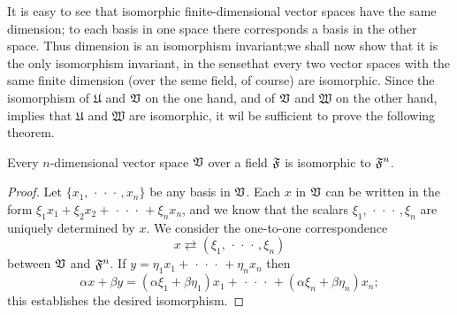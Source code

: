 It is easy to see that isomorphic finite-dimensional vector spaces have the same
dimension; to each basis in one space there corresponds a basis in the other
space. Thus dimension is an isomorphism invariant;we shall now show that it is
the only isomorphism invariant, in the sensethat every two vector spaces with
the same finite dimension (over the seme field, of course) are isomorphic. Since
the isomorphism of \(\mathfrak{U}\) and \(\mathfrak{V}\) on the one hand, and of
\(\mathfrak{V}\) and \(\mathfrak{W}\) on the other hand, implies that \(\mathfrak{U}\)
and \(\mathfrak{W}\) are isomorphic, it wil be sufficient to prove the following
theorem.

\begin{thmx}
    Every \(n\)-dimensional vector space \(\mathfrak{V}\) over a field \(\mathfrak{F}\) is
    isomorphic to \(\mathfrak{F}^n\).
\end{thmx}

\begin{proof}
    Let \(\{x_1, \,\cdot\,\cdot\,\cdot\,, x_n\}\) be any basis in \(\mathfrak{V}\).
    Each \(x\) in \(\mathfrak{V}\) can be written in the form \(\xi_1 x_1 + \xi_2 x_2
    + \,\cdot\,\cdot\,\cdot\, + \xi_n x_n\), and we know that the scalars
    \(\xi_1, \,\cdot\,\cdot\,\cdot\,, \xi_n\) are uniquely determined by \(x\).
    We consider the one-to-one correspondence
    \begin{equation*}
        x \rightleftarrows (\xi_1, \,\cdot\,\cdot\,\cdot\,, \xi_n)
    \end{equation*}
    between \(\mathfrak{V}\) and \(\mathfrak{F}^n\). If \(y = \eta_1 x_1 +
    \,\cdot\,\cdot\,\cdot\, + \eta_n x_n\) then
    \begin{equation*}
        \alpha x + \beta y = (\alpha \xi_1 + \beta \eta_1) x_1 + \,\cdot\,\cdot\,\cdot\, + (\alpha \xi_n + \beta \eta_n) x_n;
    \end{equation*}
    this establishes the desired isomorphism.
\end{proof}

